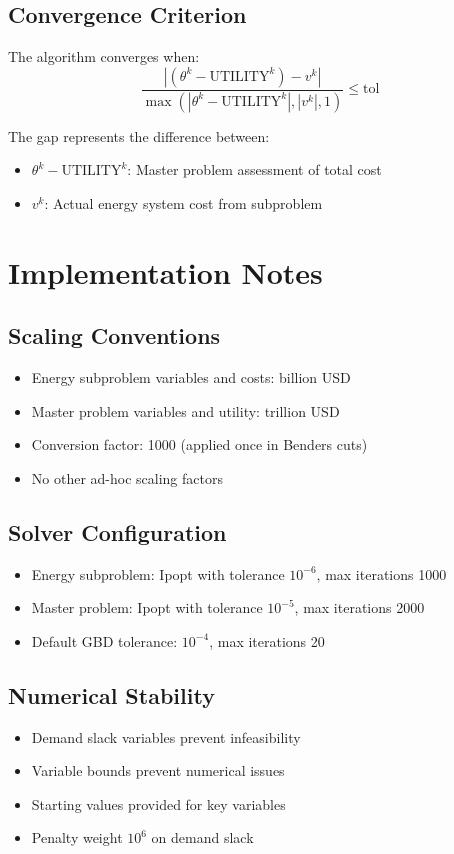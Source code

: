 \documentclass[11pt]{article}
\begin{document}
\subsection{Convergence Criterion}
The algorithm converges when:
\begin{equation}
\frac{|(\theta^k - \text{UTILITY}^k) - v^k|}{\max(|\theta^k - \text{UTILITY}^k|, |v^k|, 1)} \leq \text{tol}
\end{equation}

The gap represents the difference between:
\begin{itemize}
\item $\theta^k - \text{UTILITY}^k$: Master problem assessment of total cost
\item $v^k$: Actual energy system cost from subproblem
\end{itemize}

\section{Implementation Notes}

\subsection{Scaling Conventions}
\begin{itemize}
\item Energy subproblem variables and costs: billion USD
\item Master problem variables and utility: trillion USD  
\item Conversion factor: 1000 (applied once in Benders cuts)
\item No other ad-hoc scaling factors
\end{itemize}

\subsection{Solver Configuration}
\begin{itemize}
\item Energy subproblem: Ipopt with tolerance $10^{-6}$, max iterations 1000
\item Master problem: Ipopt with tolerance $10^{-5}$, max iterations 2000
\item Default GBD tolerance: $10^{-4}$, max iterations 20
\end{itemize}

\subsection{Numerical Stability}
\begin{itemize}
\item Demand slack variables prevent infeasibility
\item Variable bounds prevent numerical issues
\item Starting values provided for key variables
\item Penalty weight $10^6$ on demand slack
\end{itemize}
\end{document}
